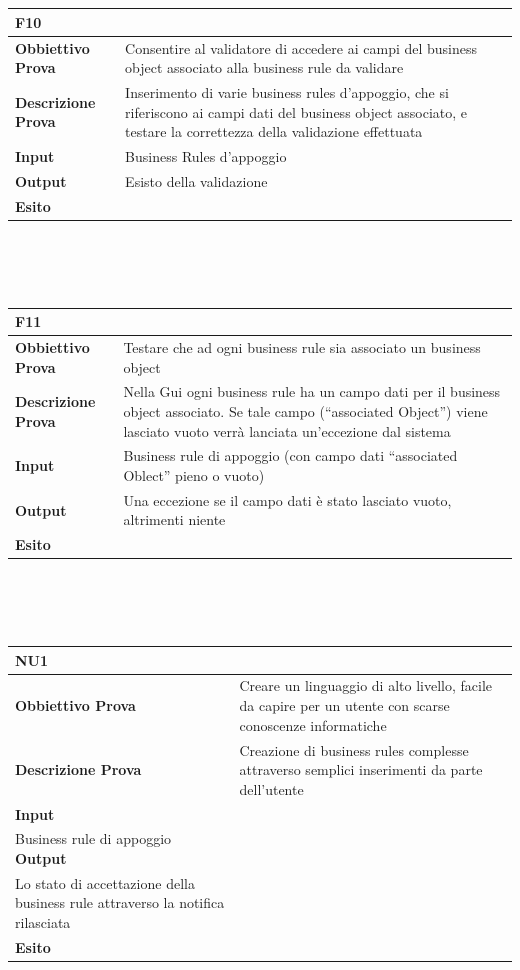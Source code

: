\documentclass[11pt,titlepage,a4paper]{report}
\begin{document}
\\
\\
\begin{tabular}{||p{4.5cm}||p{7.5cm}||}
\hline
\textbf{\textsf{F10}}& \\
\hline
{\textbf {Obbiettivo Prova}}& Consentire al validatore di accedere ai campi del business object associato alla business rule da validare \\ \hline
{\textbf{Descrizione Prova}}&  Inserimento di varie business rules d'appoggio, che si riferiscono ai campi dati del business object associato, e testare la correttezza della validazione effettuata \\ \hline
{\textbf{Input}}&  Business Rules d'appoggio \\ \hline
{\textbf{Output}}& Esisto della validazione \\ \hline
{\textbf{Esito}}&  \\ \hline
\end{tabular} \\
\\
\\
\begin{tabular}{||p{4.5cm}||p{7.5cm}||}
\hline
\textbf{\textsf{F11}}& \\
\hline
{\textbf {Obbiettivo Prova}}& Testare che ad ogni business rule sia associato un business object \\ \hline
{\textbf{Descrizione Prova}}&  Nella Gui ogni business rule ha un campo dati per il business object associato. Se tale campo (``associated Object'') viene lasciato vuoto verr\`a lanciata un'eccezione dal sistema\\ \hline
{\textbf{Input}}&  Business rule di appoggio (con campo dati ``associated Oblect'' pieno o vuoto)\\ \hline
{\textbf{Output}}& Una eccezione se il campo dati \`e stato lasciato vuoto, altrimenti niente \\ \hline
{\textbf{Esito}}&  \\ \hline
\end{tabular} \\
\\
\\
\begin{tabular}{||p{4.5cm}||p{7.5cm}||}
\hline
\textbf{\textsf{NU1}}& \\
\hline
{\textbf {Obbiettivo Prova}}& Creare un linguaggio di alto livello, facile da capire per un utente con scarse conoscenze informatiche\\ \hline
{\textbf{Descrizione Prova}}& Creazione di business rules complesse attraverso semplici inserimenti da parte dell'utente\\ \hline
{\textbf{Input}}&  \\ \hline Business rule di appoggio
{\textbf{Output}}& \\ \hline Lo stato di accettazione della business rule attraverso la notifica rilasciata\\ \hline
{\textbf{Esito}}&  \\ \hline
\end{tabular} \\
\end{document}
